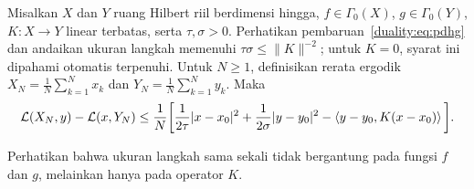 \begin{theorem}
    Misalkan $X$ dan $Y$ ruang Hilbert riil berdimensi hingga, $f\in\Gamma_0(X)$, $g\in\Gamma_0(Y)$, $K:X\rightarrow Y$ linear terbatas, serta $\tau,\sigma>0$. Perhatikan pembaruan~\eqref{duality:eq:pdhg} dan andaikan ukuran langkah memenuhi $\tau\sigma\leq \|K\|^{-2}$; untuk $K=0$, syarat ini dipahami otomatis terpenuhi. Untuk $N\geq1$, definisikan rerata ergodik $X_N = \frac{1}{N}\sum_{k=1}^{N}x_k$ dan $Y_N = \frac{1}{N}\sum_{k=1}^{N}y_k$. Maka
    \begin{equation}
        \mathcal{L}(X_{N},y) - \mathcal{L}(x,Y_{N})\leq \frac{1}{N}\bigg[\frac{1}{2\tau}|x-x_0|^2 + \frac{1}{2\sigma}|y-y_0|^2 - \left\langle y-y_0 , K(x-x_{0})\right\rangle\bigg].
    \end{equation}
\end{theorem}
\begin{rem}
    Perhatikan bahwa ukuran langkah sama sekali tidak bergantung pada fungsi $f$ dan $g$, melainkan hanya pada operator $K$.

\end{rem}
